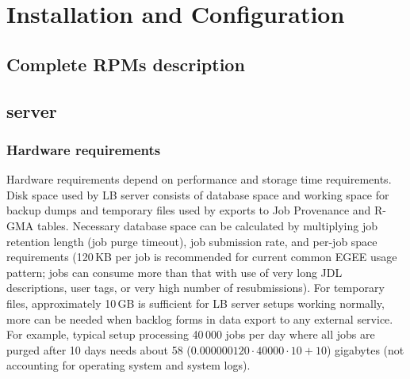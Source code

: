 \section{Installation and Configuration}
\TODO{}

\subsection{Complete RPMs description}

\subsection{\LB server}

\subsubsection{Hardware requirements}

Hardware requirements depend on performance and storage time requirements.
Disk space used by LB server consists of database space and working space 
for backup dumps and temporary files used by exports to Job Provenance and
R-GMA tables. Necessary database space can be calculated by multiplying 
job retention length (job purge timeout), job submission rate, and  
per-job space requirements (120\,KB per job is recommended for current common 
EGEE usage pattern; jobs can consume more than that with use of very long
JDL descriptions, user tags, or very high number of resubmissions).
For temporary files, approximately 10\,GB is sufficient for LB server setups
working normally, more can be needed when backlog forms in data export
to any external service. For example, typical setup processing 40\,000 jobs per 
day where all jobs are purged after 10 days needs about 58
($0.000000120\cdot 40000\cdot 10 + 10$) gigabytes (not accounting for operating 
system and system logs).

